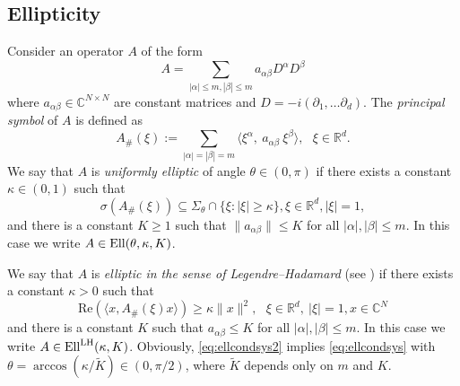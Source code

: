 \documentclass{amsart}
\theoremstyle{plain}
\theoremstyle{remark}
\theoremstyle{plain}
\numberwithin{equation}{section}
\begin{document}
\subsection{Ellipticity}
Consider an operator $A$ of the form
\[A = \sum_{|\alpha|\leq m, |\beta|\leq m} a_{\alpha\beta}D^{\alpha}D^{\beta}\]
where $a_{\alpha\beta}\in { \mathbb{C} }^{N\times N}$ are constant matrices and $D = -i(\partial_{1}, \ldots \partial_d)$.  The \textit{principal symbol} of $A$ is defined as
\begin{equation}\label{eq:prinSymSystem}
A_{\#}(\xi):=\sum_{|\alpha| = |\beta|=m} {\langle} \xi^{\alpha},\ a_{\alpha\beta}\ \xi^{\beta}{\rangle},\ \ \ \xi\in{ \mathbb{R} }^{d}.
\end{equation}
We say that $A$ is \textit{uniformly elliptic} of angle $\theta\in (0,\pi)$ if there exists a constant $\kappa\in (0,1)$ such that
\begin{equation}\label{eq:ellcondsys}
\sigma(A_{\#}(\xi))\subseteq\Sigma_{\theta}\cap \{\xi: |\xi|\geq \kappa\}, \xi\in { \mathbb{R} }^d, |\xi|=1,
\end{equation}
and there is a constant $K\geq 1$ such that $\|a_{\alpha\beta}\|\leq K$ for all $|\alpha|,|\beta|\leq m$.
In this case we write $A\in{\rm Ell}(\theta,\kappa,K)$.

We say that $A$ is {\em elliptic in the sense of Legendre--Hadamard} (see \cite{DK11, Fried64, GiaMart}) if there exists a constant $\kappa>0$ such that
\begin{equation}\label{eq:ellcondsys2}
\text{Re}({\langle} x, A_{\#}(\xi) x{\rangle}) \geq\kappa \|x\|^2,\ \ \ \xi\in{ \mathbb{R} }^{d},\ |\xi|=1, x\in { \mathbb{C} }^N
\end{equation}
and there is a constant $K$ such that $a_{\alpha\beta}\leq K$ for all $|\alpha|,|\beta|\leq m$. In this case we write $A\in {\rm Ell}^{\rm LH}(\kappa, K)$. Obviously, \eqref{eq:ellcondsys2} implies \eqref{eq:ellcondsys} with $\theta = \arccos(\kappa/\tilde{K})\in (0,\pi/2)$, where $\tilde{K}$ depends only on $m$ and $K$.
\end{document}
